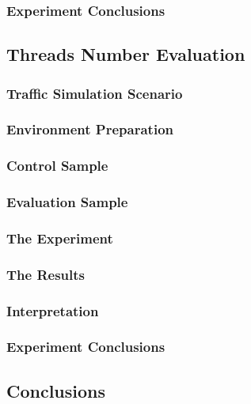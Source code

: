 \documentclass[10pt,a4paper]{article}
\begin{document}
\subsubsection{Experiment Conclusions} 

\subsection{Threads Number Evaluation}
\subsubsection{Traffic Simulation Scenario} 
\subsubsection{Environment Preparation} 
\subsubsection{Control Sample} 
\subsubsection{Evaluation Sample} 
\subsubsection{The Experiment} 
\subsubsection{The Results} 
\subsubsection{Interpretation} 
\subsubsection{Experiment Conclusions} 


\subsection{Conclusions} 

\pagebreak
\clearpage
\end{document}

